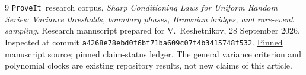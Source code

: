 \documentclass[11pt,a4paper]{article}
\numberwithin{equation}{section}
\theoremstyle{definition}
\theoremstyle{remark}
\newcommand{\repo}{\texttt{ProveIt}}
\newcommand{\commit}{\texttt{a4268e78ebd0f6bf71ba609c07f4b3415748f532}}
\begin{document}
\begin{thebibliography}{9}
\repo\ research corpus,
\emph{Sharp Conditioning Laws for Uniform Random Series:
Variance thresholds, boundary phases, Brownian bridges, and rare-event
sampling}.
Research manuscript prepared for V.~Reshetnikov, 28 September 2026.
Inspected at commit \commit.
\href{https://github.com/VladimirReshetnikov/ProveIt/blob/a4268e78ebd0f6bf71ba609c07f4b3415748f532/Analysis/FabiusFunction/docs/semi-formalized-research-frontiers/drafts/representations/Sharp_Conditioning_Laws_Uniform_Random_Series/article.tex}{Pinned manuscript source};
\href{https://github.com/VladimirReshetnikov/ProveIt/blob/a4268e78ebd0f6bf71ba609c07f4b3415748f532/Analysis/FabiusFunction/docs/semi-formalized-research-frontiers/drafts/representations/Sharp_Conditioning_Laws_Uniform_Random_Series/CLAIM_STATUS.md}{pinned claim-status ledger}.
The general variance criterion and polynomial clocks are existing
repository results, not new claims of this article.
\end{thebibliography}
\end{document}
